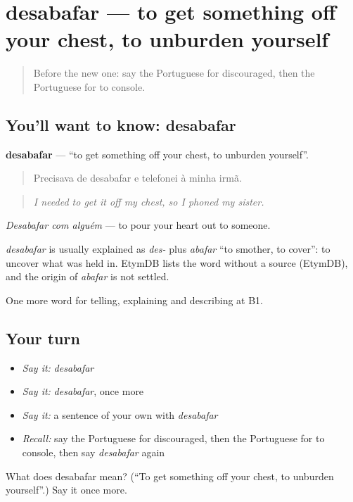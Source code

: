 \section[desabafar]{desabafar — to get something off your chest, to unburden yourself}

\label{lesson:PT-C476-desabafar}



\begin{quote}
Before the new one: say the Portuguese for discouraged, then the Portuguese for to console.
\end{quote}

\subsection*{You'll want to know: desabafar}
\textbf{desabafar} — \textquotedblleft{}to get something off your chest, to unburden yourself\textquotedblright{}.

\begin{quote}
Precisava de desabafar e telefonei à minha irmã.
\end{quote}

\begin{quote}
\emph{I needed to get it off my chest, so I phoned my sister.}
\end{quote}

\emph{Desabafar com alguém} — to pour your heart out to someone.

\begin{cousinweb}
\emph{desabafar} is usually explained as \emph{des-} plus \emph{abafar} \textquotedblleft{}to smother, to cover\textquotedblright{}: to uncover what was held in. EtymDB lists the word without a source (EtymDB), and the origin of \emph{abafar} is not settled.
\end{cousinweb}

\begin{grammarlens}[title={What you've built}]
One more word for telling, explaining and describing at B1.
\end{grammarlens}

\subsection*{Your turn}
\begin{itemize}
\raggedright
  \item \emph{Say it:} \emph{desabafar}
  \item \emph{Say it:} \emph{desabafar}, once more
  \item \emph{Say it:} a sentence of your own with \emph{desabafar}
  \item \emph{Recall:} say the Portuguese for discouraged, then the Portuguese for to console, then say \emph{desabafar} again
\end{itemize}

\begin{tcolorbox}[breakable,colback=teal!4,colframe=teal!35!black,title={Before you move on}]
What does desabafar mean? (\textquotedblleft{}To get something off your chest, to unburden yourself\textquotedblright{}.) Say it once more.
\end{tcolorbox}
